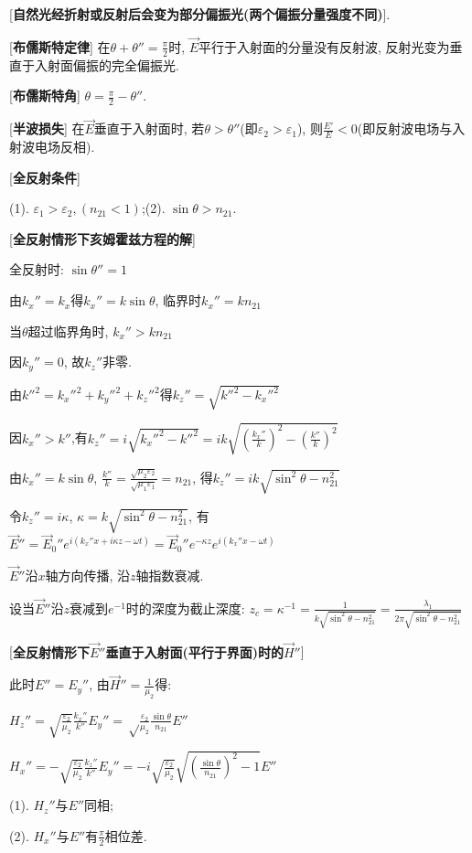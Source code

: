 [\textbf{自然光经折射或反射后会变为部分偏振光(两个偏振分量强度不同)}].\par

[\textbf{布儒斯特定律}] 在$\theta+\theta''=\frac{\pi}{2}$时, $\vec E$平行于入射面的分量没有反射波, 反射光变为垂直于入射面偏振的完全偏振光.\par

[\textbf{布儒斯特角}] $\theta=\frac{\pi}{2}-\theta''$.\par

[\textbf{半波损失}] 在$\vec E$垂直于入射面时, 若$\theta>\theta''$(即$\varepsilon_2>\varepsilon_1$), 则$\frac{E'}{E}<0$(即反射波电场与入射波电场反相).\par

[\textbf{全反射条件}]\par
\qquad (1). $\varepsilon_1>\varepsilon_2, (n_{21}<1)$;\quad (2). $\sin\theta>n_{21}$.\par

\clearpage

[\textbf{全反射情形下亥姆霍兹方程的解}]\par
\qquad 全反射时: $\sin\theta''=1$\par
\qquad 由$k_x''=k_x$得$k_x''=k\sin\theta$, 临界时$k_x''=kn_{21}$\par
\qquad 当$\theta$超过临界角时, $k_x''>kn_{21}$\par
\qquad 因$k_y''=0$, 故$k_z''$非零.\par
\qquad 由$k''^2=k_x''^2+k_y''^2+k_z''^2$得$k_z''=\sqrt{k''^2-k_x''^2}$\par
\qquad 因$k_x''>k''$,有$k_z''=i\sqrt{k_x''^2-k''^2}=ik\sqrt{\left(\frac{k_x''}{k}\right)^2-\left(\frac{k''}{k}\right)^2}$\par
\qquad 由$k_x''=k\sin\theta$, $\frac{k''}{k}=\frac{\sqrt{\mu_2\varepsilon_2}}{\sqrt{\mu_1\varepsilon_1}}=n_{21}$, 得$k_z''=ik\sqrt{\sin^2\theta-n_{21}^2}$\par
\qquad 令$k_z''=i\kappa$, $\kappa=k\sqrt{\sin^2\theta-n_{21}^2}$, 有$\vec E''=\vec E_0''e^{i(k_x''x+i\kappa z-\omega t)}=\vec E_0''e^{-\kappa z}e^{i(k_x''x-\omega t)}$\par
\qquad $\vec E''$沿$x$轴方向传播, 沿$z$轴指数衰减.\par
\qquad \qquad 设当$\vec E''$沿$z$衰减到$e^{-1}$时的深度为截止深度: $z_c=\kappa^{-1}=\frac{1}{k\sqrt{\sin^2\theta-n_{21}^2}}=\frac{\lambda_1}{2\pi\sqrt{\sin^2\theta-n_{21}^2}}$\par

[\textbf{全反射情形下$\vec E''$垂直于入射面(平行于界面)时的$\vec H''$}]\par
\qquad 此时$E''=E_y''$, 由$\vec H''=\frac{1}{\mu_2}$得:\par
\qquad \qquad $H_z''=\sqrt{\frac{\varepsilon_2}{\mu_2}}\frac{k_x''}{k''}E_y''=\sqrt\frac{\varepsilon_2}{\mu_2}\frac{\sin\theta}{n_{21}}E''$\par
\qquad \qquad $H_x''=-\sqrt{\frac{\varepsilon_2}{\mu_2}}\frac{k_z''}{k''}E_y''=-i\sqrt{\frac{\varepsilon_2}{\mu_2}}\sqrt{\left(\frac{\sin\theta}{n_{21}}\right)^2-1}E''$\par
\qquad (1). $H_z''$与$E''$同相;\par
\qquad (2). $H_x''$与$E''$有$\frac{\pi}{2}$相位差.\par

